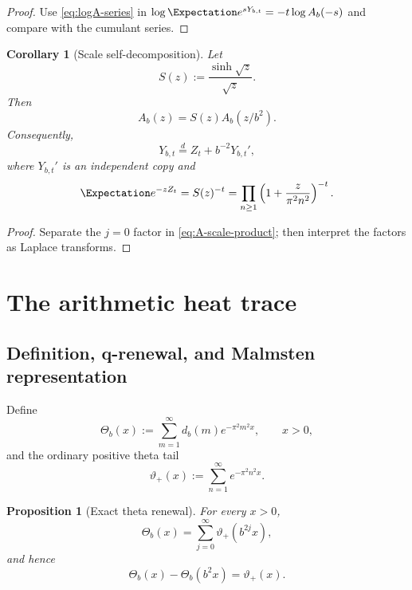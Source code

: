 \documentclass[11pt]{article}
\newtheorem{proposition}[theorem]{Proposition}
\newtheorem{corollary}[theorem]{Corollary}
\theoremstyle{definition}
\theoremstyle{remark}
\begin{document}
\begin{proof}
Use \eqref{eq:logA-series} in
\(
\log\Expectation e^{sY_{b,t}}=-t\log A_b(-s)
\)
and compare with the cumulant series.
\end{proof}

\begin{corollary}[Scale self-decomposition]\label{cor:selfdecomp}
Let
\begin{equation}
  S(z):=\frac{\sinh\sqrt z}{\sqrt z}.
\end{equation}
Then
\begin{equation}\label{eq:A-renewal}
  A_b(z)=S(z)A_b(z/b^2).
\end{equation}
Consequently,
\begin{equation}\label{eq:Y-selfdecomp}
  Y_{b,t}\stackrel{d}{=}Z_t+b^{-2}Y_{b,t}',
\end{equation}
where \(Y_{b,t}'\) is an independent copy and
\begin{equation}
  \Expectation e^{-zZ_t}=S(z)^{-t}
  =\prod_{n\ge1}\left(1+\frac{z}{\pi^2n^2}\right)^{-t}.
\end{equation}
\end{corollary}

\begin{proof}
Separate the \(j=0\) factor in \eqref{eq:A-scale-product}; then interpret the factors as Laplace transforms.
\end{proof}

\section{The arithmetic heat trace}

\subsection{Definition, q-renewal, and Malmsten representation}

Define
\begin{equation}\label{eq:Theta-definition}
  \Theta_b(x):=\sum_{m=1}^{\infty}d_b(m)e^{-\pi^2m^2x},
  \qquad x>0,
\end{equation}
and the ordinary positive theta tail
\begin{equation}
  \vartheta_+(x):=\sum_{n=1}^{\infty}e^{-\pi^2n^2x}.
\end{equation}

\begin{proposition}[Exact theta renewal]\label{prop:theta-renewal}
For every \(x>0\),
\begin{equation}\label{eq:Theta-theta-sum}
  \Theta_b(x)=\sum_{j=0}^{\infty}\vartheta_+(b^{2j}x),
\end{equation}
and hence
\begin{equation}\label{eq:Theta-q-difference}
  \Theta_b(x)-\Theta_b(b^2x)=\vartheta_+(x).
\end{equation}
\end{proposition}
\end{document}
